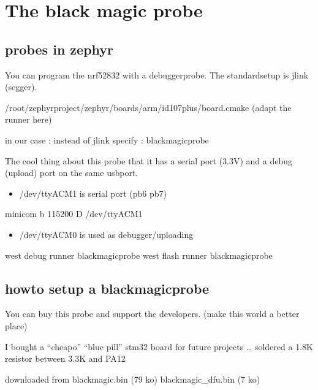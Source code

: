 \documentclass[letterpaper,10pt,english]{sphinxmanual}
\begin{document}
\section{The black magic probe}
\label{\detokenize{debugging/blackmagicprobe:the-black-magic-probe}}\label{\detokenize{debugging/blackmagicprobe::doc}}

\subsection{probes in zephyr}
\label{\detokenize{debugging/blackmagicprobe:probes-in-zephyr}}
You can program the nrf52832 with a debuggerprobe.
The standard\sphinxhyphen{}setup is jlink (segger).

/root/zephyrproject/zephyr/boards/arm/id107plus/board.cmake (adapt the runner here)

in our case : instead of jlink specify : blackmagicprobe

The cool thing about this probe that it has a serial port (3.3V) and a debug (upload) port on the same usb\sphinxhyphen{}port.
\begin{itemize}
\item {} 
/dev/ttyACM1 is serial port (pb6 pb7)

\end{itemize}

minicom \sphinxhyphen{}b 115200 \sphinxhyphen{}D /dev/ttyACM1
\begin{itemize}
\item {} 
/dev/ttyACM0 is used as debugger/uploading

\end{itemize}

west debug \textendash{}runner blackmagicprobe
west flash \textendash{}runner blackmagicprobe


\subsection{howto setup a blackmagicprobe}
\label{\detokenize{debugging/blackmagicprobe:howto-setup-a-blackmagicprobe}}
You can buy this probe and support the developers. (make this world a better place)

I bought a “cheapo” “blue pill” stm32 board for future projects …
soldered a 1.8K resistor between 3.3K and PA12

downloaded from 
\sphinxhyphen{} blackmagic.bin (79 ko)
\sphinxhyphen{} blackmagic\_dfu.bin (7 ko)
\end{document}
